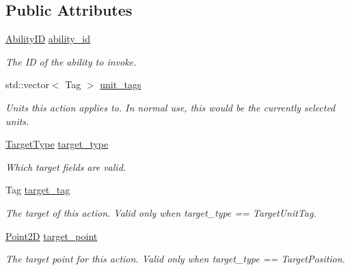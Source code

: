 \subsection*{Public Attributes}
\begin{DoxyCompactItemize}
\item 
\mbox{\label{structsc2_1_1_action_raw_af4084f9dec15364aea72d01e6f555d56}} 
\hyperlink{classsc2_1_1_s_c2_type}{Ability\+ID} \hyperlink{structsc2_1_1_action_raw_af4084f9dec15364aea72d01e6f555d56}{ability\+\_\+id}
\begin{DoxyCompactList}\small\item\em The ID of the ability to invoke. \end{DoxyCompactList}\item 
\mbox{\label{structsc2_1_1_action_raw_ac8767f8740a584a60b39d27cd3df620c}} 
std\+::vector$<$ Tag $>$ \hyperlink{structsc2_1_1_action_raw_ac8767f8740a584a60b39d27cd3df620c}{unit\+\_\+tags}
\begin{DoxyCompactList}\small\item\em Units this action applies to. In normal use, this would be the currently selected units. \end{DoxyCompactList}\item 
\mbox{\label{structsc2_1_1_action_raw_a6bd32cf44980cbaacc41fe56d338c3d7}} 
\hyperlink{structsc2_1_1_action_raw_a18505ce7c00e382d636339eba391d800}{Target\+Type} \hyperlink{structsc2_1_1_action_raw_a6bd32cf44980cbaacc41fe56d338c3d7}{target\+\_\+type}
\begin{DoxyCompactList}\small\item\em Which target fields are valid. \end{DoxyCompactList}\item 
\mbox{\label{structsc2_1_1_action_raw_acd2f5da93f22943c4c3b1bcbeb1e9a28}} 
Tag \hyperlink{structsc2_1_1_action_raw_acd2f5da93f22943c4c3b1bcbeb1e9a28}{target\+\_\+tag}
\begin{DoxyCompactList}\small\item\em The target of this action. Valid only when target\+\_\+type == Target\+Unit\+Tag. \end{DoxyCompactList}\item 
\mbox{\label{structsc2_1_1_action_raw_af35667a06a46069209f5f364c7530195}} 
\hyperlink{structsc2_1_1_point2_d}{Point2D} \hyperlink{structsc2_1_1_action_raw_af35667a06a46069209f5f364c7530195}{target\+\_\+point}
\begin{DoxyCompactList}\small\item\em The target point for this action. Valid only when target\+\_\+type == Target\+Position. \end{DoxyCompactList}\end{DoxyCompactItemize}



